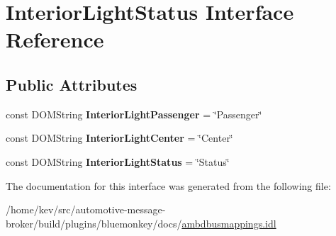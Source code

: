 \hypertarget{interfaceInteriorLightStatus}{\section{Interior\+Light\+Status Interface Reference}
\label{interfaceInteriorLightStatus}
}
\subsection*{Public Attributes}
\begin{DoxyCompactItemize}
\item 
\hypertarget{interfaceInteriorLightStatus_abf8320eb6b0e7c6b60bbc90d91760832}{const D\+O\+M\+String {\bfseries Interior\+Light\+Passenger} = \char`\"{}Passenger\char`\"{}}\label{interfaceInteriorLightStatus_abf8320eb6b0e7c6b60bbc90d91760832}

\item 
\hypertarget{interfaceInteriorLightStatus_a65f623a6bfcf7dd09b8634ea2bd28238}{const D\+O\+M\+String {\bfseries Interior\+Light\+Center} = \char`\"{}Center\char`\"{}}\label{interfaceInteriorLightStatus_a65f623a6bfcf7dd09b8634ea2bd28238}

\item 
\hypertarget{interfaceInteriorLightStatus_a93968b6203be5a851eece2ba7d94efb3}{const D\+O\+M\+String {\bfseries Interior\+Light\+Status} = \char`\"{}Status\char`\"{}}\label{interfaceInteriorLightStatus_a93968b6203be5a851eece2ba7d94efb3}

\end{DoxyCompactItemize}


The documentation for this interface was generated from the following file\+:\begin{DoxyCompactItemize}
\item 
/home/kev/src/automotive-\/message-\/broker/build/plugins/bluemonkey/docs/\hyperlink{ambdbusmappings_8idl}{ambdbusmappings.\+idl}\end{DoxyCompactItemize}
